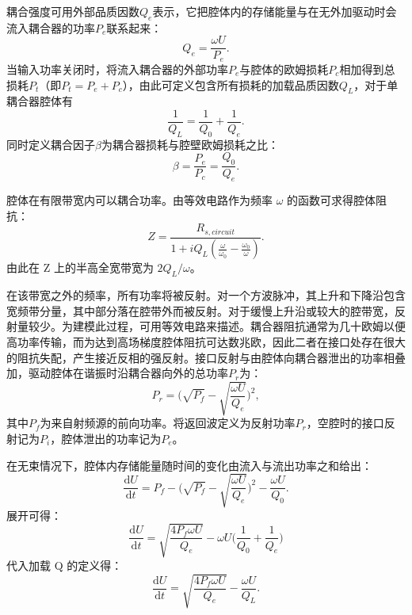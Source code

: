 \documentclass{cernyrep}
\begin{document}
耦合强度可用外部品质因数$ Q_e $表示，它把腔体内的存储能量与在无外加驱动时会流入耦合器的功率$ P_e $联系起来：
\begin{equation}
Q_e= \frac{\omega U}{P_e}.
\end{equation}
当输入功率关闭时，将流入耦合器的外部功率$ P_e $与腔体的欧姆损耗$ P_c $相加得到总损耗$ P_t $（即$ P_t = P_e + P_c $），由此可定义包含所有损耗的加载品质因数$ Q_L $，对于单耦合器腔体有
\begin{equation}
\frac{1}{Q_L} = \frac{1}{Q_0} +  \frac{1}{Q_e} .
\end{equation}
同时定义耦合因子$ \beta $为耦合器损耗与腔壁欧姆损耗之比：
\begin{equation}
\beta = \frac {P_e}{P_c} = \frac{Q_0}{Q_e}.
\end{equation}

腔体在有限带宽内可以耦合功率。由等效电路作为频率 $ \omega $ 的函数可求得腔体阻抗：
\begin{equation}
    Z=\frac{R_{s,circuit}}{1+i Q_L \left( \frac{\omega}{\omega_0}-\frac{\omega_0}{\omega}\right)}.
\end{equation}
由此在 Z 上的半高全宽带宽为 $2 Q_L/\omega$。

在该带宽之外的频率，所有功率将被反射。对一个方波脉冲，其上升和下降沿包含宽频带分量，其中部分落在腔带外而被反射。对于缓慢上升沿或较大的腔带宽，反射量较少。为建模此过程，可用等效电路来描述。耦合器阻抗通常为几十欧姆以便高功率传输，而为达到高场梯度腔体阻抗可达数兆欧，因此二者在接口处存在很大的阻抗失配，产生接近反相的强反射。接口反射与由腔体向耦合器泄出的功率相叠加，驱动腔体在谐振时沿耦合器向外的总功率$ P_r $为：
\begin{equation}
\label{eqn_ReflectU}
P_r= \Bigg(\sqrt{P_f}-\sqrt{ \frac{\omega U}{Q_e}} \Bigg)^2,
\end{equation}
其中$ P_f $为来自射频源的前向功率。将返回波定义为反射功率$ P_r $，空腔时的接口反射记为$ P_i $，腔体泄出的功率记为$ P_e $。

在无束情况下，腔体内存储能量随时间的变化由流入与流出功率之和给出：
\begin{equation}
\frac {\mathrm{d}U}{\mathrm{d}t}= P_f-\Bigg(\sqrt{P_f}-\sqrt{ \frac{\omega U}{Q_e}} \Bigg)^2-\frac{\omega U}{Q_0}.
\end{equation}
展开可得：
\begin{equation}
\frac {\mathrm{d}U}{\mathrm{d}t}= \sqrt{ \frac{4 P_f \omega U}{Q_e}}-\omega U \Big( \frac{1}{Q_0} +  \frac{1}{Q_e} \Big)
\end{equation}
代入加载 Q 的定义得：
\begin{equation}
\frac {\mathrm{d}U}{\mathrm{d}t}= \sqrt{ \frac{4 P_f \omega U}{Q_e}}- \frac{\omega U}{Q_L}.
\end{equation}
\end{document}

